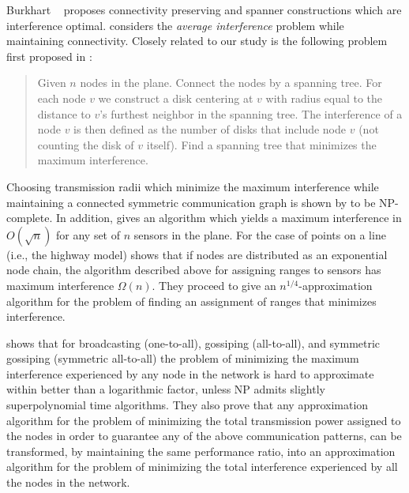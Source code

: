 \documentclass{patmorin}
\begin{document}
Burkhart \etal\ \cite{burkhart2004} proposes connectivity preserving and 
spanner constructions which are interference optimal. 
\cite{moscibroda2005} considers the {\em average interference} problem while
maintaining connectivity.
Closely related to our study is 
the following problem first proposed in \cite{locher2008}:
\begin{quote}
Given $n$ nodes in the
plane. Connect the nodes by a spanning tree. For each node $v$ we construct a
disk centering at $v$ with radius equal to the distance to $v$'s furthest neighbor in
the spanning tree. The interference of a node $v$ is then defined as the number
of disks that include node $v$ (not counting the disk of $v$ itself). Find a spanning
tree that minimizes the maximum interference.
\end{quote}
Choosing transmission radii which minimize the
maximum interference while maintaining a connected symmetric 
communication graph 
is shown by \cite{buchin2008} to be
NP-complete.
In addition,
\cite{halldorsson2008} gives an algorithm which yields a
maximum interference in $O( \sqrt{n})$ for any set of $n$ sensors in the plane. 
For the case of points
on a line (i.e., the highway model)
\cite{vonrickenbach2005} shows that if nodes are distributed as an exponential node chain, the algorithm described above for assigning ranges to sensors has maximum interference $\Omega(n)$. They proceed to give an $n^{1/4}$-approximation algorithm for the problem of finding an assignment
of ranges that minimizes interference.

\cite{bilo2008} shows that for 
broadcasting (one-to-all), gossiping (all-to-all), and symmetric gossiping (symmetric all-to-all)
the problem of minimizing the maximum interference experienced by
any node in the network is hard to approximate within better than
a logarithmic factor, unless NP admits slightly superpolynomial 
time algorithms. They also prove that any approximation algorithm for the problem of minimizing the total transmission power assigned to the nodes in order to guarantee any of the above communication patterns, can be transformed, by maintaining the same performance ratio, into an approximation algorithm for the problem of minimizing the total interference experienced by all the nodes in the network.
\end{document}

